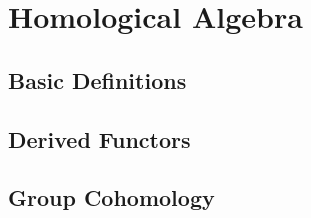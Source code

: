 \chapter{Homological Algebra}

\section{Basic Definitions}

\section{Derived Functors}

\section{Group Cohomology}

